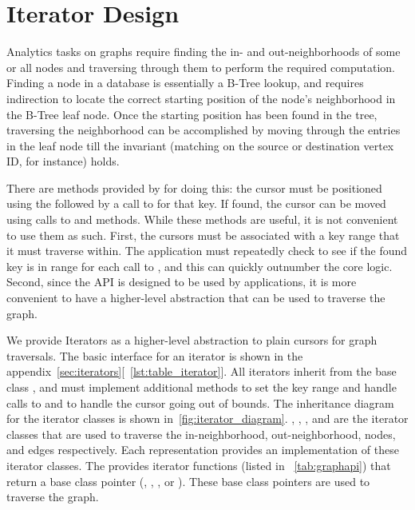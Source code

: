 \section{Iterator Design}
\label{arch:iterators}
Analytics tasks on graphs require finding the in- and out-neighborhoods of some or all nodes and traversing through them to perform the required computation.
Finding a node in a \wt{} database is essentially a B-Tree lookup, and requires indirection to locate the correct starting position of the node's neighborhood in the B-Tree leaf node.
Once the starting position has been found in the tree, traversing the neighborhood can be accomplished by moving through the entries in the leaf node till the invariant (matching on the source or destination vertex ID, for instance) holds. 

There are methods provided by \wt{} for doing this: the cursor must be positioned using the  followed by a call to  for that key.
If found, the cursor can be moved using calls to  and  methods.
While these methods are useful, it is not convenient to use them as such.
First, the cursors must be associated with a key range that it must traverse within.
The application must repeatedly check to see if the found key is in range for each call to , and this can quickly outnumber the core logic.
Second, since the API is designed to be used by applications, it is more convenient to have a higher-level abstraction that can be used to traverse the graph.

We provide Iterators as a higher-level abstraction to plain cursors for graph traversals.
The basic interface for an iterator is shown in the appendix~\autoref{sec:iterators}[~\autoref{lst:table_iterator}].
All iterators inherit from the base class , and must implement additional methods to set the key range and handle calls to  and to handle the cursor going out of bounds.
The inheritance diagram for the iterator classes is shown in~\autoref{fig:iterator_diagram}.
, , , and  are the iterator classes that are used to traverse the in-neighborhood, out-neighborhood, nodes, and edges respectively.
Each representation provides an implementation of these iterator classes.
The \api{} provides iterator functions (listed in ~\autoref{tab:graphapi}) that return a base class pointer (, , , or ).
These base class pointers are used to traverse the graph.

